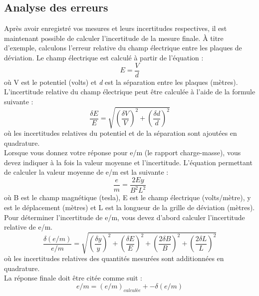 \documentclass[../main.tex]{subfiles}
\begin{document}
\subsection{Analyse des erreurs}
Après avoir enregistré vos mesures et leurs incertitudes respectives, il est maintenant possible de calculer l'incertitude de la mesure finale.  À titre d'exemple, calculons l'erreur relative du champ électrique entre les plaques de déviation.  Le champ électrique est calculé à partir de l'équation :\\
$$E=\frac{V}{d}$$ 
où V est le potentiel (volts) et \textit{d} est la séparation entre les plaques (mètres).  L'incertitude relative du champ électrique peut être calculée à l'aide de la formule suivante :\\
$$\frac{\delta E}{E} = \sqrt{(\frac{\delta V}{V})^2 + (\frac{\delta d}{d})^2}$$
où les incertitudes relatives du potentiel et de la séparation sont ajoutées en quadrature.\\
Lorsque vous donnez votre réponse pour e/m (le rapport charge-masse), vous devez indiquer à la fois la valeur moyenne et l'incertitude.  L'équation permettant de calculer la valeur moyenne de e/m est la suivante :\\
$$\frac{e}{m} = \frac{2Ey}{B^2L^2}$$
où B est le champ magnétique (tesla), E est le champ électrique (volts/mètre), y est le déplacement (mètres) et L est la longueur de la grille de déviation (mètres).\\
Pour déterminer l'incertitude de e/m, vous devez d'abord calculer l'incertitude relative de e/m.\\
$$\frac{\delta (e/m)}{e/m} = \sqrt{(\frac{\delta y}{y})^2 + (\frac{\delta E}{E})^2 + (\frac{2 \delta B}{B})^2 +(\frac{2 \delta L}{L})^2 }$$
où les incertitudes relatives des quantités mesurées sont additionnées en quadrature.\\
La réponse finale doit être citée comme suit :\\
$$e/m = (e/m)_{calculée} +- \delta(e/m)$$
\end{document}
